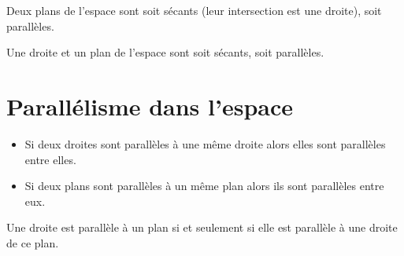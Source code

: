 \documentclass{cornouaille}
\renewcommand\standalonepath[1]{G2/figures/#1}
\begin{document}
\begin{proprietes}
Deux plans de l'espace sont soit sécants (leur intersection est une
droite), soit parallèles.
\end{proprietes}

\begin{ltableau}{\linewidth}{3}
  \hline
   &  \tabularnewline\hline
  } & 
  } &  
  }\tabularnewline\hline
\end{ltableau}

\pagebreak

\begin{proprietes}
  Une droite et un plan de l'espace sont soit sécants, soit parallèles.
\end{proprietes}

\begin{ltableau}{\linewidth}{4}
  \hline
   & 
   \tabularnewline\hline
  } & 
  } &  
  \centering
  }\tabularnewline
  \hline
\end{ltableau}

\section{Parallélisme dans l'espace}

\begin{propriete}
  \begin{itemize}
  \item Si deux droites sont parallèles à une même droite alors elles
    sont parallèles entre elles.
  \item Si deux plans sont parallèles à un même plan alors ils sont
    parallèles entre eux.
  \end{itemize}
\end{propriete}
           
\begin{propriete}
  Une droite est parallèle à un plan si et seulement si elle est
  parallèle à une droite de ce plan.
\end{propriete}
\end{document}
